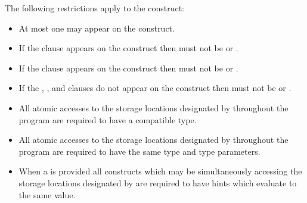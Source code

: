 \begin{samepage}


\restrictions

The following restrictions apply to the  construct:

\begin{itemize}
\item At most one  may appear on the construct.

\item If the  clause appears on the construct then
 must not be  or .

\item If the  clause appears on the construct then
 must not be  or .

\item If the , , and  clauses do not
appear on the construct then  must not be 
or .
\end{itemize}

\begin{ccppspecific}
\begin{itemize}
\item All atomic accesses to the storage locations designated by  throughout the program 
are required to have a compatible type. 
\end{itemize}
\end{ccppspecific}
\end{samepage}

\begin{fortranspecific}
\begin{itemize}
\item All atomic accesses to the storage locations designated by  throughout the program 
are required to have the same type and type parameters. 
\end{itemize}
\end{fortranspecific}

\begin{itemize}
\item When a  is provided all  constructs which
may be simultaneously accessing the storage locations designated by
 are required to have hints which evaluate to the same value. 
\end{itemize}

